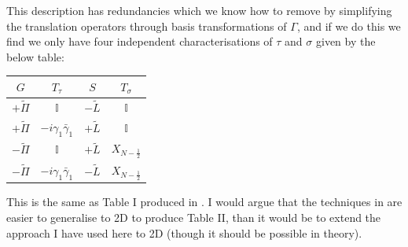\documentclass{article}
\begin{document}
This description has redundancies which we know how to remove by simplifying the translation operators through basis transformations of $\Gamma$, and if we do this we find we only have four independent characterisations of $\tau$ and $\sigma$ given by the below table:

\begin{table}[htbp]
    \centering
    \begin{tabular}{|c|c|c|c|} \hline
        $G$ & $T_{\tau}$ &$S$ &$T_{\sigma}$  \\ \hline
         $+\tilde\Pi$&$\mathbb{I}$&$-\tilde L$&$\mathbb{I}$\\
         $+\tilde\Pi$&$-i \gamma_1\bar{\gamma}_1$&$+\tilde L$&$\mathbb{I}$\\
         $-\tilde\Pi$&$\mathbb{I}$&$+\tilde L$&$X_{N-\frac{1}{2}}$\\
         $-\tilde\Pi$&$-i \gamma_1\bar{\gamma}_1$&$-\tilde L$&$X_{N-\frac{1}{2}}$\\\hline
    \end{tabular}
\end{table}
This is the same as Table I produced in \cite{PhysRevB.111.115126}. I would argue that the techniques in \cite{PhysRevB.111.115126} are easier to generalise to 2D to produce Table II, than it would be to extend the approach I have used here to 2D (though it should be possible in theory). 
\printbibliography
\end{document}
